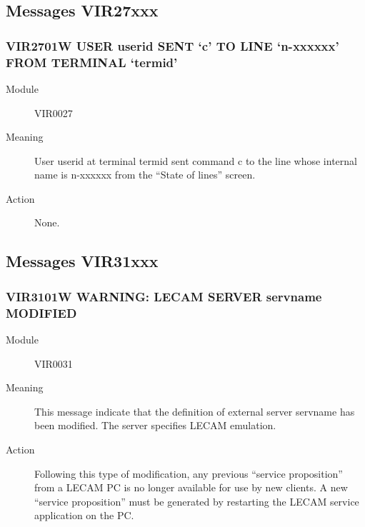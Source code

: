 \documentclass[letterpaper,10pt,english]{sphinxmanual}
\begin{document}
\subsection{Messages VIR27xxx}
\label{\detokenize{messages:messages-vir27xxx}}

\subsubsection{VIR2701W USER userid SENT ‘c’ TO LINE ‘n-xxxxxx’ FROM TERMINAL ‘termid’}
\label{\detokenize{messages:vir2701w-user-userid-sent-c-to-line-n-xxxxxx-from-terminal-termid}}\begin{description}
\item[{Module}] \leavevmode
VIR0027

\item[{Meaning}] \leavevmode
User userid at terminal termid sent command c to the line whose internal name is n-xxxxxx from the “State of lines” screen.

\item[{Action}] \leavevmode
None.

\end{description}


\subsection{Messages VIR31xxx}
\label{\detokenize{messages:messages-vir31xxx}}

\subsubsection{VIR3101W WARNING: LECAM SERVER servname MODIFIED}
\label{\detokenize{messages:vir3101w-warning-lecam-server-servname-modified}}\begin{description}
\item[{Module}] \leavevmode
VIR0031

\item[{Meaning}] \leavevmode
This message indicate that the definition of external server servname has been modified. The server specifies LECAM emulation.

\item[{Action}] \leavevmode
Following this type of modification, any previous “service proposition” from a LECAM PC is no longer available for use by new clients. A new “service proposition” must be generated by restarting the LECAM service application on the PC.

\end{description}
\end{document}
